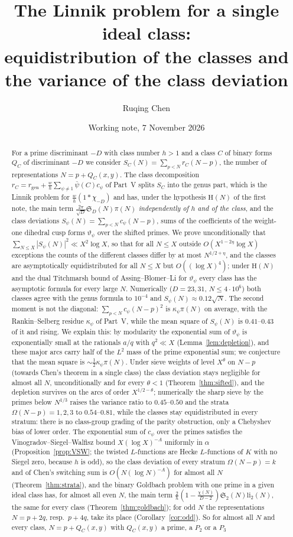 ﻿\documentclass[11pt]{amsart}
\title[The Linnik problem for a single ideal class]{The Linnik problem for a single ideal class:\\ equidistribution of the classes and the variance of the class deviation}
\author{Ruqing Chen}
\date{Working note, 7 November 2026}
\theoremstyle{remark}
\newcommand{\sS}{\mathfrak S}
\newcommand{\vt}{\vartheta}
\newcommand{\gen}{\mathrm{gen}}
\begin{document}
\begin{abstract}
For a prime discriminant $-D$ with class number $h>1$ and a class $C$ of binary forms $Q_C$ of discriminant $-D$ we consider $S_C(N)=\sum_{p<N}r_C(N-p)$, the number of representations $N=p+Q_C(x,y)$. The class decomposition $r_C=r_\gen+\frac wh\sum_{\psi\ne1}\bar\psi(C)c_\psi$ of Part~V splits $S_C$ into the genus part, which is the Linnik problem for $\frac wh(1*\chi_{-D})$ and has, under the hypothesis $\mathrm H(N)$ of the first note, the main term $\frac{2\pi}{\sqrt D}\sS_D(N)\pi(N)$ \emph{independently of $h$ and of the class}, and the class deviations $S_\psi(N)=\sum_{p<N}c_\psi(N-p)$, sums of the coefficients of the weight-one dihedral cusp forms $\vt_\psi$ over the shifted primes. We prove unconditionally that $\sum_{N\le X}|S_\psi(N)|^2\ll X^2\log X$, so that for all $N\le X$ outside $O(X^{1-2\eta}\log X)$ exceptions the counts of the different classes differ by at most $N^{1/2+\eta}$, and the classes are asymptotically equidistributed for all $N\le X$ but $O((\log X)^4)$; under $\mathrm H(N)$ and the dual Titchmarsh bound of Assing--Blomer--Li for $\vt_\psi$ every class has the asymptotic formula for every large $N$. Numerically ($D=23,31$, $N\le4\cdot10^6$) both classes agree with the genus formula to $10^{-4}$ and $S_\psi(N)\approx0.12\sqrt N$. The second moment is not the diagonal: $\sum_{p<N}c_\psi(N-p)^2$ is $\kappa_\psi\pi(N)$ on average, with the Rankin--Selberg residue $\kappa_\psi$ of Part~V, while the mean square of $S_\psi(N)$ is $0.41$--$0.43$ of it and rising. We explain this: by modularity the exponential sum of $\vt_\psi$ is exponentially small at the rationals $a/q$ with $q^2\ll X$ (Lemma~\ref{lem:depletion}), and these major arcs carry half of the $L^2$ mass of the prime exponential sum; we conjecture that the mean square is $\sim\frac12\kappa_\psi\pi(N)$. Under sieve weights of level $X^\theta$ on $N-p$ (towards Chen's theorem in a single class) the class deviation stays negligible for almost all $N$, unconditionally and for every $\theta<1$ (Theorem~\ref{thm:sifted}), and the depletion survives on the arcs of order $X^{1/2-\theta}$; numerically the sharp sieve by the primes below $N^{1/3}$ raises the variance ratio to $0.45$--$0.50$ and the strata $\Omega(N-p)=1,2,3$ to $0.54$--$0.81$, while the classes stay equidistributed in every stratum: there is no class-group grading of the parity obstruction, only a Chebyshev bias of lower order. The exponential sum of $c_\psi$ over the primes satisfies the Vinogradov--Siegel--Walfisz bound $X(\log X)^{-A}$ uniformly in $\alpha$ (Proposition~\ref{prop:VSW}; the twisted $L$-functions are Hecke $L$-functions of $K$ with no Siegel zero, because $h$ is odd), so the class deviation of every stratum $\Omega(N-p)=k$ and of Chen's switching sum is $O(N(\log N)^{-A})$ for almost all $N$ (Theorem~\ref{thm:strata}), and the binary Goldbach problem with one prime in a given ideal class has, for almost all even $N$, the main term $\frac2h(1-\frac{\chi(N)}{D-2})\sS_2(N)\mathrm{li}_2(N)$, the same for every class (Theorem~\ref{thm:goldbach}); for odd $N$ the representations $N=p+2q$, resp.\ $p+4q$, take its place (Corollary~\ref{cor:odd}). So for almost all $N$ and every class, $N=p+Q_C(x,y)$ with $Q_C(x,y)$ a prime, a $P_2$ or a $P_3$ 
\end{abstract}
\end{document}

